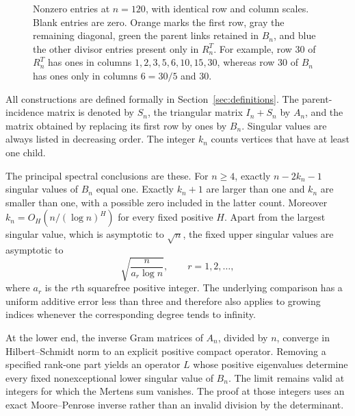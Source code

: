 \begin{figure}[t]
\centering

\caption{Nonzero entries at $n=120$, with identical row and column scales. Blank entries are zero. Orange marks the first row, gray the remaining diagonal, green the parent links retained in $B_n$, and blue the other divisor entries present only in $R_n^T$. For example, row $30$ of $R_n^T$ has ones in columns $1,2,3,5,6,10,15,30$, whereas row $30$ of $B_n$ has ones only in columns $6=30/5$ and $30$.}
\label{fig:redheffer}
\end{figure}

All constructions are defined formally in Section~\ref{sec:definitions}. The parent-incidence matrix is denoted by $S_n$, the triangular matrix $I_n+S_n$ by $A_n$, and the matrix obtained by replacing its first row by ones by $B_n$. Singular values are always listed in decreasing order. The integer $k_n$ counts vertices that have at least one child.

The principal spectral conclusions are these. For $n\ge4$, exactly $n-2k_n-1$ singular values of $B_n$ equal one. Exactly $k_n+1$ are larger than one and $k_n$ are smaller than one, with a possible zero included in the latter count. Moreover $k_n=O_H(n/(\log n)^H)$ for every fixed positive $H$. Apart from the largest singular value, which is asymptotic to $\sqrt n$, the fixed upper singular values are asymptotic to
\[
 \sqrt{\frac{n}{a_r\log n}},\qquad r=1,2,\ldots,
\]
where $a_r$ is the $r$th squarefree positive integer. The underlying comparison has a uniform additive error less than three and therefore also applies to growing indices whenever the corresponding degree tends to infinity.

At the lower end, the inverse Gram matrices of $A_n$, divided by $n$, converge in Hilbert--Schmidt norm to an explicit positive compact operator. Removing a specified rank-one part yields an operator $L$ whose positive eigenvalues determine every fixed nonexceptional lower singular value of $B_n$. The limit remains valid at integers for which the Mertens sum vanishes. The proof at those integers uses an exact Moore--Penrose inverse rather than an invalid division by the determinant.

